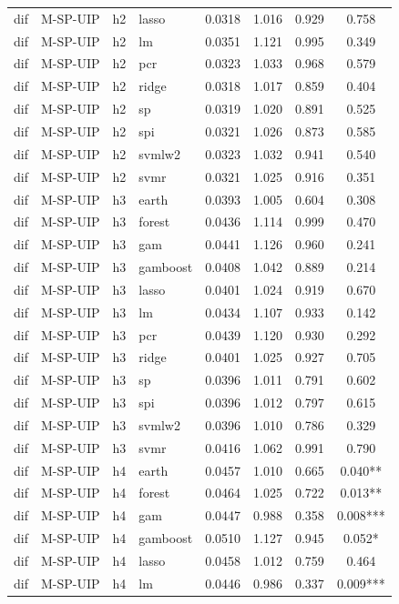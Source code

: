 \begin{ThreePartTable}
\begin{longtable}[t]{llclcccc}
dif & M-SP-UIP & h2 & lasso & 0.0318 & 1.016 & 0.929 & 0.758\\
dif & M-SP-UIP & h2 & lm & 0.0351 & 1.121 & 0.995 & 0.349\\
dif & M-SP-UIP & h2 & pcr & 0.0323 & 1.033 & 0.968 & 0.579\\
dif & M-SP-UIP & h2 & ridge & 0.0318 & 1.017 & 0.859 & 0.404\\
dif & M-SP-UIP & h2 & sp & 0.0319 & 1.020 & 0.891 & 0.525\\
dif & M-SP-UIP & h2 & spi & 0.0321 & 1.026 & 0.873 & 0.585\\
dif & M-SP-UIP & h2 & svmlw2 & 0.0323 & 1.032 & 0.941 & 0.540\\
dif & M-SP-UIP & h2 & svmr & 0.0321 & 1.025 & 0.916 & 0.351\\
\addlinespace
dif & M-SP-UIP & h3 & earth & 0.0393 & 1.005 & 0.604 & 0.308\\
dif & M-SP-UIP & h3 & forest & 0.0436 & 1.114 & 0.999 & 0.470\\
dif & M-SP-UIP & h3 & gam & 0.0441 & 1.126 & 0.960 & 0.241\\
dif & M-SP-UIP & h3 & gamboost & 0.0408 & 1.042 & 0.889 & 0.214\\
dif & M-SP-UIP & h3 & lasso & 0.0401 & 1.024 & 0.919 & 0.670\\
dif & M-SP-UIP & h3 & lm & 0.0434 & 1.107 & 0.933 & 0.142\\
dif & M-SP-UIP & h3 & pcr & 0.0439 & 1.120 & 0.930 & 0.292\\
dif & M-SP-UIP & h3 & ridge & 0.0401 & 1.025 & 0.927 & 0.705\\
dif & M-SP-UIP & h3 & sp & 0.0396 & 1.011 & 0.791 & 0.602\\
dif & M-SP-UIP & h3 & spi & 0.0396 & 1.012 & 0.797 & 0.615\\
dif & M-SP-UIP & h3 & svmlw2 & 0.0396 & 1.010 & 0.786 & 0.329\\
dif & M-SP-UIP & h3 & svmr & 0.0416 & 1.062 & 0.991 & 0.790\\
\addlinespace
dif & M-SP-UIP & h4 & earth & 0.0457 & 1.010 & 0.665 & 0.040**\\
dif & M-SP-UIP & h4 & forest & 0.0464 & 1.025 & 0.722 & 0.013**\\
dif & M-SP-UIP & h4 & gam & 0.0447 & 0.988 & 0.358 & 0.008***\\
dif & M-SP-UIP & h4 & gamboost & 0.0510 & 1.127 & 0.945 & 0.052*\\
dif & M-SP-UIP & h4 & lasso & 0.0458 & 1.012 & 0.759 & 0.464\\
dif & M-SP-UIP & h4 & lm & 0.0446 & 0.986 & 0.337 & 0.009***\\

\end{longtable}
\end{ThreePartTable}

